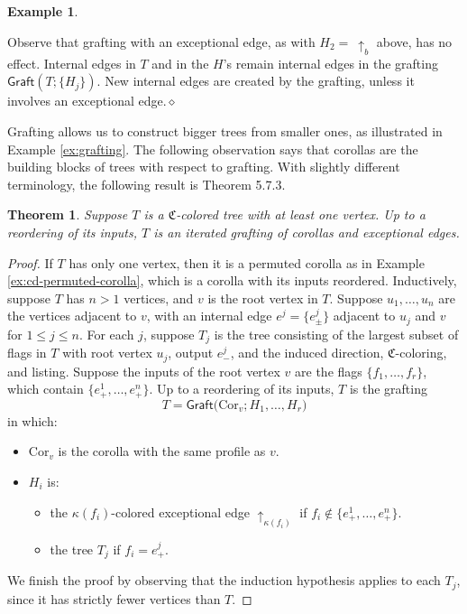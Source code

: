 \documentclass[11pt]{amsbook}
\numberwithin{section}{chapter}
\numberwithin{subsection}{section}
\numberwithin{equation}{section}
\theoremstyle{plain}
\newtheorem{theorem}[equation]{Theorem}
\theoremstyle{definition}
\newtheorem{example}[equation]{Example}
\newcommand{\colorc}{\mathfrak{C}}
\newcommand{\Cor}{\mathrm{Cor}}
\newcommand{\graft}{\mathsf{Graft}}
\newcommand{\dqed}{\hfill$\diamond$}
\begin{document}
\begin{example}
\begin{center}
\end{center}
Observe that grafting with an exceptional edge, as with $H_2 =~ \uparrow_b$ above, has no effect.  Internal edges in $T$ and in the $H$'s remain internal edges in the grafting $\graft(T;\{H_j\})$.  New internal edges are created by the grafting, unless it involves an exceptional edge.\dqed
\end{example}

Grafting allows us to construct bigger trees from smaller ones, as illustrated in Example \ref{ex:grafting}.  The following observation says that corollas are the building blocks of trees with respect to grafting.  With slightly different terminology, the following result is \cite{yau-operad} Theorem 5.7.3.

\begin{theorem}\label{thm:grafting-generate}
Suppose $T$ is a $\colorc$-colored tree with at least one vertex.  Up to a reordering of its inputs, $T$ is an iterated grafting of corollas and exceptional edges.
\end{theorem}

\begin{proof}
If $T$ has only one vertex, then it is a permuted corolla as in Example \ref{ex:cd-permuted-corolla}, which is a corolla with its inputs reordered.  Inductively,  suppose $T$ has $n>1$ vertices, and $v$ is the root vertex in $T$.  Suppose $u_1,\ldots,u_n$ are the vertices adjacent to $v$, with an internal edge $e^j=\{e^j_{\pm}\}$ adjacent to $u_j$ and $v$ for $1 \leq j \leq n$.  For each $j$, suppose $T_j$ is the tree consisting of the largest subset of flags in $T$ with root vertex $u_j$, output $e^j_-$, and the induced direction, $\colorc$-coloring, and listing.  Suppose the inputs of the root vertex $v$ are the flags $\{f_1,\ldots,f_r\}$, which contain $\{e^1_+,\ldots,e^n_+\}$.   Up to a reordering of its inputs, $T$ is the grafting
\[T = \graft\bigl(\Cor_v;H_1,\ldots,H_r\bigr)\] in which:
\begin{itemize}
\item $\Cor_v$ is the corolla with the same profile as $v$.
\item $H_i$ is:
\begin{itemize}\item the $\kappa(f_i)$-colored exceptional edge $\uparrow_{\kappa(f_i)}$ if $f_i \not\in\{e^1_+,\ldots,e^n_+\}$.
\item the tree $T_j$ if $f_i=e^j_+$.
\end{itemize}\end{itemize} 
We finish the proof by observing that the induction hypothesis applies to each $T_j$, since it has strictly fewer vertices than $T$.
\end{proof}
\end{document}
